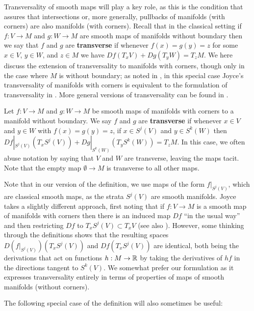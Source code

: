 Transversality of smooth maps will play a key role, as this is the condition that assures that intersections or, more generally, pullbacks of manifolds (with corners) are also manifolds (with corners).
Recall that in the classical setting if $f \colon V \to M$ and $g \colon W \to M$ are smooth maps of manifolds without boundary then we say that $f$ and $g$ are \textbf{transverse} if whenever $f(x) = g(y) = z$ for some $x \in V$, $y \in W$, and $z \in M$ we have $Df(T_xV)+Dg(T_yW) = T_z M$.
We here discuss the extension of transversality to manifolds with corners, though only in the case where $M$ is without boundary; as noted in \cite[Remark 6.3]{Joy12}, in this special case Joyce's transversality of manifolds with corners is equivalent to the formulation of transversality in \cite[Section 7.2]{MaDo92}.
More general versions of transversality can be found in \cite[Section 6]{Joy12}.

\begin{definition}{\cite[Special case of Definition 6.1]{Joy12}}
	Let $f \colon V \to M$ and $g \colon W \to M$ be smooth maps of manifolds with corners to a manifold without boundary.
	We say $f$ and $g$ are \textbf{transverse} if whenever $x \in V$ and $y\in W$ with $f(x) = g(y) = z$, if $x\in S^j(V)$ and $y \in S^k(W)$ then $Df|_{S^j(V)}(T_xS^j(V))+Dg|_{S^k(W)}(T_yS^k(W)) = T_zM$.
	In this case, we often abuse notation by saying that $V$ and $W$ are transverse, leaving the maps tacit.
	Note that the empty map $\emptyset \to M$ is transverse to all other maps.
\end{definition}

Note that in our version of the definition, we use maps of the form $f|_{S^j(V)}$, which are classical smooth maps, as the strata $S^j(V)$ are smooth manifolds. Joyce takes a slightly different approach, first noting that if $f:V\to M$ is a smooth map of manifolds with corners then there is an induced map $Df$ ``in the usual way'' \cite[Definition 3.2]{Joy12} and then restricting $Df$ to $T_xS^j(V)\subset T_xV$ (see also \cite[Proposition 2.4]{Joy12}). However, some thinking through the definitions shows that the resulting spaces $D(f|_{S^j(V)})(T_xS^j(V))$ and $Df(T_xS^j(V))$ are identical, both being the derivations that act on functions $h:M\to \mathbb{R}$ by taking the derivatives of $hf$ in the directions tangent to $S^k(V)$. We somewhat prefer our formulation as it expresses transversality entirely in terms of properties of maps of smooth manifolds (without corners).

The following special case of the definition will also sometimes be useful:

